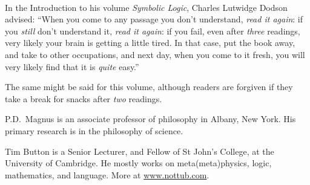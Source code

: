 \thispagestyle{empty}
\onecolumn
\ 
\vfill

\parbox{3 in}{
In the Introduction to his volume \emph{Symbolic Logic}, Charles Lutwidge Dodson advised: ``When you come to any passage you don't understand, \emph{read it again}: if you \emph{still} don't understand it, \emph{read it again}: if you fail, even after \emph{three} readings, very likely your brain is getting a little tired. In that case, put the book away, and take to other occupations, and next day, when you come to it fresh, you will very likely find that it is \emph{quite} easy.''

\medskip

The same might be said for this volume, although readers are forgiven if they take a break for snacks after \emph{two} readings.}

\vfill

\parbox{3 in}{
P.D.\ Magnus is an associate professor of philosophy in Albany, New York. His primary research is in the philosophy of science.

\medskip

Tim Button is a Senior Lecturer, and Fellow of St John's College, at the University of Cambridge. He mostly works on meta(meta)physics, logic, mathematics, and language. More at \url{www.nottub.com}.}
\vfill